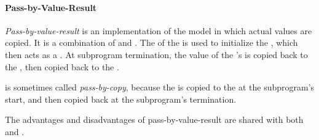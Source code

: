 \paragraph{Pass-by-Value-Result}\label{par:Parameter_Passing-Pass_By_Value_Result}
\begin{definition}\label{def:Pass_By_Value_Result}
  \emph{Pass-by-value-result} is an implementation of the  model in which actual values are copied.
  It is a combination of  and .
  The  of the  is used to initialize the , which then acts as a .
  At subprogram termination, the value of the 's  is copied back to the , then copied back to the .

  \begin{remark}\label{rmk:Pass_By_Copy}
     is sometimes called \emph{pass-by-copy}, because the  is copied to the  at the subprogram's start, and then copied back at the subprogram's termination.
  \end{remark}

  The advantages and disadvantages of pass-by-value-result are shared with both  and .
\end{definition}

